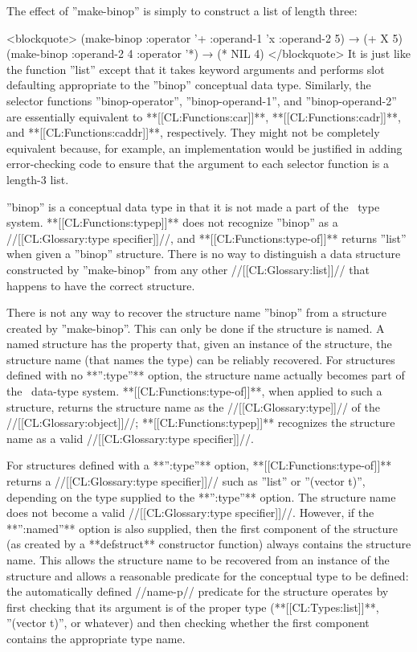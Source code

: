 The effect of ''make-binop'' is simply to construct a list of length three:

<blockquote> (make-binop :operator '+ :operand-1 'x :operand-2 5) → (+ X 5) (make-binop :operand-2 4 :operator '*) → (* NIL 4) </blockquote> It is just like the function ''list'' except that it takes keyword arguments and performs slot defaulting appropriate to the ''binop'' conceptual data type. Similarly, the selector functions ''binop-operator'', ''binop-operand-1'', and ''binop-operand-2'' are essentially equivalent to **[[CL:Functions:car]]**, **[[CL:Functions:cadr]]**, and **[[CL:Functions:caddr]]**, respectively. They might not be completely equivalent because, for example, an implementation would be justified in adding error-checking code to ensure that the argument to each selector function is a length-3 list.

''binop'' is a conceptual data type in that it is not made a part of the \clisp\ type system. **[[CL:Functions:typep]]** does not recognize ''binop'' as a //[[CL:Glossary:type specifier]]//, and **[[CL:Functions:type-of]]** returns ''list'' when given a ''binop'' structure. There is no way to distinguish a data structure constructed by ''make-binop'' from any other //[[CL:Glossary:list]]// that happens to have the correct structure.

There is not any way to recover the structure name ''binop'' from a structure created by ''make-binop''. This can only be done if the structure is named. A named structure has the property that, given an instance of the structure, the structure name (that names the type) can be reliably recovered. For structures defined with no **'':type''** option, the structure name actually becomes part of the \clisp\ data-type system. **[[CL:Functions:type-of]]**, when applied to such a structure, returns the structure name as the //[[CL:Glossary:type]]// of the //[[CL:Glossary:object]]//; **[[CL:Functions:typep]]** recognizes the structure name as a valid //[[CL:Glossary:type specifier]]//.

For structures defined with a **'':type''** option, **[[CL:Functions:type-of]]** returns a //[[CL:Glossary:type specifier]]// such as ''list'' or ''(vector t)'', depending on the type supplied to the **'':type''** option. The structure name does not become a valid //[[CL:Glossary:type specifier]]//. However, if the **'':named''** option is also supplied, then the first component of the structure (as created by a **defstruct** constructor function) always contains the structure name. This allows the structure name to be recovered from an instance of the structure and allows a reasonable predicate for the conceptual type to be defined: the automatically defined //name-p// predicate for the structure operates by first checking that its argument is of the proper type (**[[CL:Types:list]]**, ''(vector t)'', or whatever) and then checking whether the first component contains the appropriate type name.

